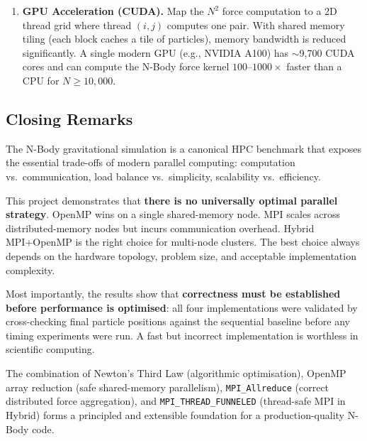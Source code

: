 ﻿\documentclass[12pt,a4paper]{article}
\begin{document}
\begin{enumerate}
    \item \textbf{GPU Acceleration (CUDA).}
          Map the $N^2$ force computation to a 2D thread grid where thread
          $(i,j)$ computes one pair. With shared memory tiling (each block
          caches a tile of particles), memory bandwidth is reduced
          significantly. A single modern GPU (e.g., NVIDIA A100) has
          $\sim$9{,}700 CUDA cores and can compute the N-Body force kernel
          $100$--$1000\times$ faster than a CPU for $N \geq 10{,}000$.
\end{enumerate}

\subsection{Closing Remarks}

The N-Body gravitational simulation is a canonical HPC benchmark that
exposes the essential trade-offs of modern parallel computing: computation
vs.\ communication, load balance vs.\ simplicity, scalability vs.\ efficiency.

This project demonstrates that \textbf{there is no universally optimal
parallel strategy}. OpenMP wins on a single shared-memory node. MPI scales
across distributed-memory nodes but incurs communication overhead. Hybrid
MPI+OpenMP is the right choice for multi-node clusters. The best choice
always depends on the hardware topology, problem size, and acceptable
implementation complexity.

Most importantly, the results show that \textbf{correctness must be
established before performance is optimised}: all four implementations were
validated by cross-checking final particle positions against the sequential
baseline before any timing experiments were run. A fast but incorrect
implementation is worthless in scientific computing.

The combination of Newton's Third Law (algorithmic optimisation), OpenMP
array reduction (safe shared-memory parallelism), \texttt{MPI\_Allreduce}
(correct distributed force aggregation), and \texttt{MPI\_THREAD\_FUNNELED}
(thread-safe MPI in Hybrid) forms a principled and extensible foundation
for a production-quality N-Body code.
\end{document}
